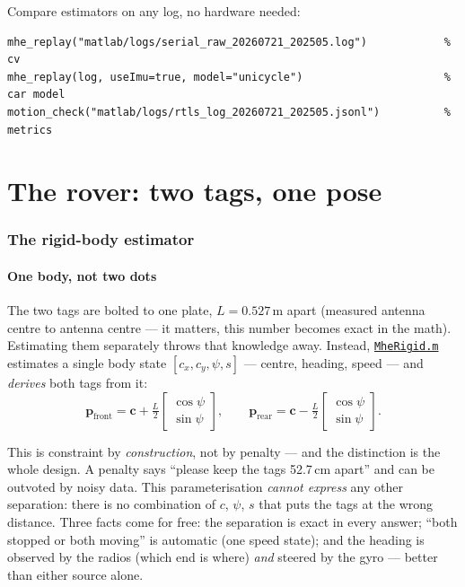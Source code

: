 \documentclass[11pt,a4paper]{article}
\newcommand{\gh}[2]{\href{https://github.com/AdershM-2/UWB_3/blob/main/#1}{\texttt{#2}}}
\begin{document}
\begin{tryit}
Compare estimators on any log, no hardware needed:
\begin{lstlisting}
mhe_replay("matlab/logs/serial_raw_20260721_202505.log")            % cv
mhe_replay(log, useImu=true, model="unicycle")                      % car model
motion_check("matlab/logs/rtls_log_20260721_202505.jsonl")          % metrics
\end{lstlisting}
\end{tryit}

\part{The rover: two tags, one pose}

\section{The rigid-body estimator}
\label{sec:rigid}

\subsection{One body, not two dots}

The two tags are bolted to one plate, $L = 0.527$\,m apart (measured antenna
centre to antenna centre --- it matters, this number becomes exact in the math).
Estimating them separately throws that knowledge away. Instead,
\gh{matlab/+dune/MheRigid.m}{MheRigid.m} estimates a single body state
$[c_x, c_y, \psi, s]$ --- centre, heading, speed --- and \emph{derives} both tags
from it:
\begin{equation}
\mathbf{p}_{\text{front}} = \mathbf{c} + \tfrac{L}{2}
\begin{bmatrix}\cos\psi\\ \sin\psi\end{bmatrix},
\qquad
\mathbf{p}_{\text{rear}} = \mathbf{c} - \tfrac{L}{2}
\begin{bmatrix}\cos\psi\\ \sin\psi\end{bmatrix}.
\end{equation}

\begin{plainwords}
This is constraint by \emph{construction}, not by penalty --- and the distinction
is the whole design. A penalty says ``please keep the tags 52.7\,cm apart'' and can
be outvoted by noisy data. This parameterisation \emph{cannot express} any other
separation: there is no combination of $c$, $\psi$, $s$ that puts the tags at the
wrong distance. Three facts come for free: the separation is exact in every
answer; ``both stopped or both moving'' is automatic (one speed state); and the
heading is observed by the radios (which end is where) \emph{and} steered by the
gyro --- better than either source alone.
\end{plainwords}
\end{document}
